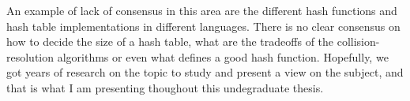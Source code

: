 An example of lack of consensus in this area are the different hash functions and hash table implementations in different languages. There is no clear consensus on how to decide the size of a hash table, what are the tradeoffs of the collision-resolution algorithms or even what defines a good hash function. Hopefully, we got years of research on the topic to study and present a view on the subject, and that is what I am presenting thoughout this undegraduate thesis.


